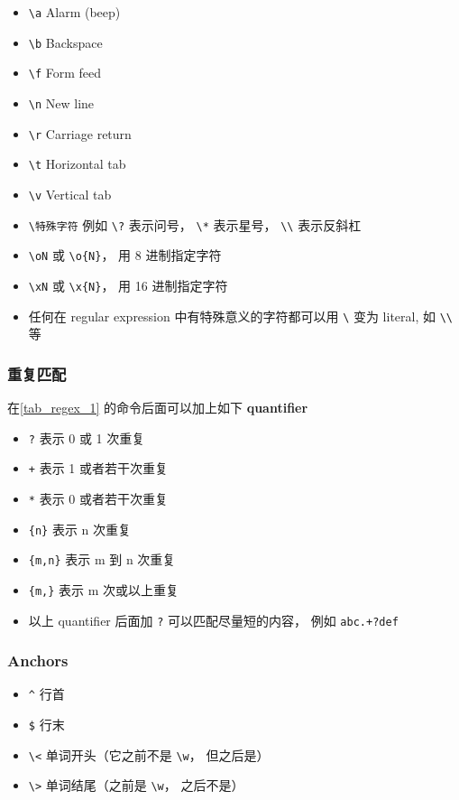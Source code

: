 \begin{itemize}
\item \verb`\a` Alarm (beep)
\item \verb`\b` Backspace
\item \verb`\f` Form feed
\item \verb`\n` New line
\item \verb`\r` Carriage return
\item \verb`\t` Horizontal tab
\item \verb`\v` Vertical tab
\item \verb`\特殊字符` 例如 \verb`\?` 表示问号， \verb`\*` 表示星号， \verb`\\` 表示反斜杠
\item \verb`\oN` 或 \verb`\o{N}`， 用 8 进制指定字符
\item \verb`\xN` 或 \verb`\x{N}`， 用 16 进制指定字符
\item 任何在 regular expression 中有特殊意义的字符都可以用 \verb`\` 变为 literal, 如 \verb`\\` 等
\end{itemize}

\subsubsection{重复匹配}
在\autoref{tab_regex_1} 的命令后面可以加上如下 \textbf{quantifier}
\begin{itemize}
\item \verb|?| 表示 0 或 1 次重复
\item \verb|+| 表示 1 或者若干次重复
\item \verb|*| 表示 0 或者若干次重复
\item \verb|{n}| 表示 n 次重复
\item \verb|{m,n}| 表示 m 到 n 次重复
\item \verb|{m,}| 表示 m 次或以上重复
\item 以上 quantifier 后面加 \verb|?| 可以匹配尽量短的内容， 例如 \verb|abc.+?def|
\end{itemize}

\subsubsection{Anchors}
\begin{itemize}
\item \verb`^` 行首
\item \verb`$` 行末
\item \verb`\<` 单词开头（它之前不是 \verb|\w|， 但之后是）
\item \verb`\>` 单词结尾（之前是 \verb|\w|， 之后不是）
\end{itemize}

